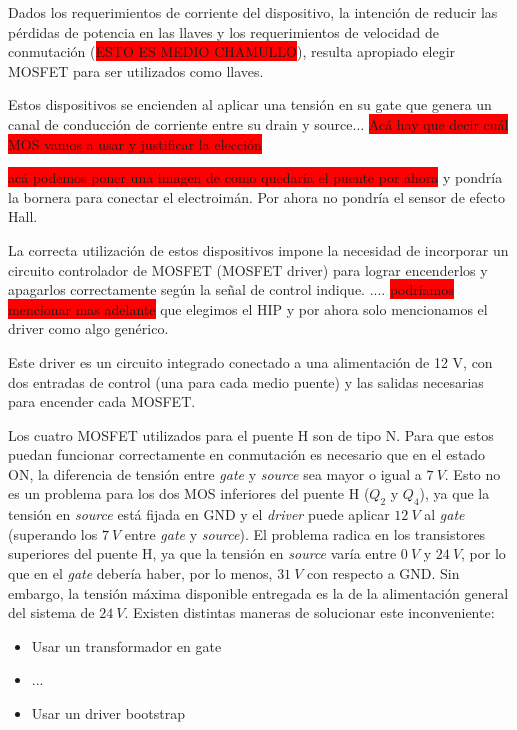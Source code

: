 Dados los requerimientos de corriente del dispositivo, la intención de reducir las pérdidas de potencia en las llaves y los requerimientos de velocidad de conmutación (\colorbox{red}{ESTO ES MEDIO CHAMULLO}), resulta apropiado elegir MOSFET para ser utilizados como llaves. 


Estos dispositivos se encienden al aplicar una tensión en su gate que genera un canal de conducción de corriente entre su drain y source...
\colorbox{red}{Acá hay que decir cuál MOS vamos a usar y justificar la elección}

\colorbox{red}{acá podemos poner una imagen de como quedaría el puente por ahora} y pondría la bornera para conectar el electroimán. Por ahora no pondría el sensor de efecto Hall.
 
La correcta utilización de estos dispositivos impone la necesidad de incorporar un circuito controlador de MOSFET (MOSFET driver) para lograr encenderlos y apagarlos correctamente según la señal de control indique. .... \colorbox{red}{podríamos mencionar mas adelante} que elegimos el HIP y por ahora solo mencionamos el driver como algo genérico.

Este driver es un circuito integrado conectado a una alimentación de 12 V, con dos entradas de control (una para cada medio puente) y las salidas necesarias para encender cada MOSFET.


\noindent Los cuatro MOSFET utilizados para el puente H son de tipo N. Para que estos puedan funcionar correctamente en conmutación es necesario que en el estado ON, la diferencia de tensión entre \textsl{gate} y \textsl{source} sea mayor o igual a $7\:V$. Esto no es un problema para los dos MOS inferiores del puente H ($Q_2$ y $Q_4$), ya que la tensión en \textsl{source} está fijada en GND y el \textsl{driver} puede aplicar $12\:V$ al \textsl{gate} (superando los $7\:V$ entre \textsl{gate} y \textsl{source}). El problema radica en los transistores superiores del puente H, ya que la tensión en \textsl{source} varía entre $0\:V$ y $24\:V$, por lo que en el \textsl{gate} debería haber, por lo menos, $31\:V$ con respecto a GND. Sin embargo, la tensión máxima disponible entregada es la de la alimentación general del sistema de $24\:V$. Existen distintas maneras de solucionar este inconveniente:

\begin{itemize}
	\item Usar un transformador en gate
	\item ...
	\item Usar un driver bootstrap
\end{itemize}


